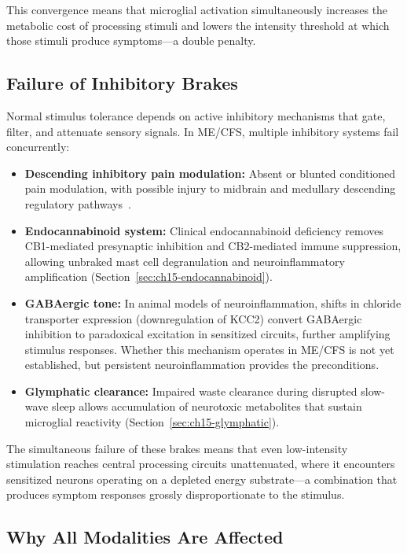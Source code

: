 This convergence means that microglial activation simultaneously increases the metabolic cost of processing stimuli and lowers the intensity threshold at which those stimuli produce symptoms---a double penalty.

\subsection{Failure of Inhibitory Brakes}

Normal stimulus tolerance depends on active inhibitory mechanisms that gate, filter, and attenuate sensory signals. In ME/CFS, multiple inhibitory systems fail concurrently:

\begin{itemize}
  \item \textbf{Descending inhibitory pain modulation:} Absent or blunted conditioned pain modulation, with possible injury to midbrain and medullary descending regulatory pathways~\cite{Baraniuk2025NociplasticMECFS}.
  \item \textbf{Endocannabinoid system:} Clinical endocannabinoid deficiency removes CB1-mediated presynaptic inhibition and CB2-mediated immune suppression, allowing unbraked mast cell degranulation and neuroinflammatory amplification (Section~\ref{sec:ch15-endocannabinoid}).
  \item \textbf{GABAergic tone:} In animal models of neuroinflammation, shifts in chloride transporter expression (downregulation of KCC2) convert GABAergic inhibition to paradoxical excitation in sensitized circuits, further amplifying stimulus responses. Whether this mechanism operates in ME/CFS is not yet established, but persistent neuroinflammation provides the preconditions.
  \item \textbf{Glymphatic clearance:} Impaired waste clearance during disrupted slow-wave sleep allows accumulation of neurotoxic metabolites that sustain microglial reactivity (Section~\ref{sec:ch15-glymphatic}).
\end{itemize}

The simultaneous failure of these brakes means that even low-intensity stimulation reaches central processing circuits unattenuated, where it encounters sensitized neurons operating on a depleted energy substrate---a combination that produces symptom responses grossly disproportionate to the stimulus.

\subsection{Why All Modalities Are Affected}

